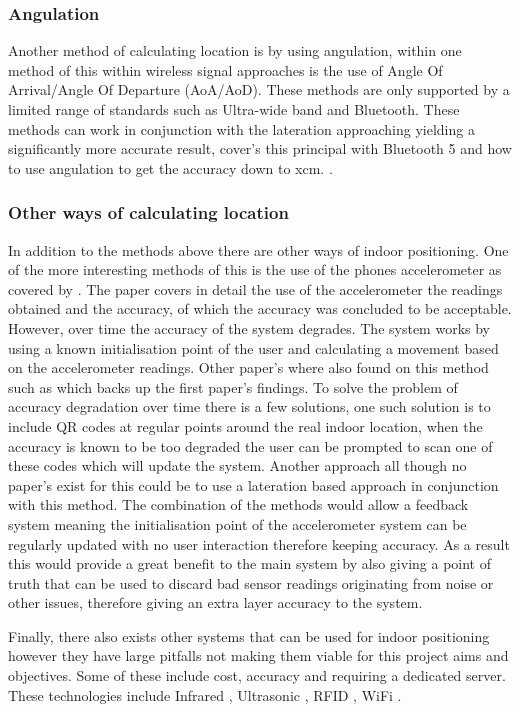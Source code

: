 \subsubsection{Angulation}
Another method of calculating location is by using angulation, within one method of this within wireless signal approaches is the use of Angle Of Arrival/Angle Of Departure (AoA/AoD). These methods are only supported by a limited range of standards such as Ultra-wide band and Bluetooth. These methods can work in conjunction with the lateration approaching yielding a significantly more accurate result, \citetemp cover's this principal with Bluetooth 5 and how to use angulation to get the accuracy down to xcm. .

\subsubsection{Other ways of calculating location}
In addition to the methods above there are other ways of indoor positioning. One of the more interesting methods of this is the use of the phones accelerometer as covered by \citetemp. The paper covers in detail the use of the accelerometer the readings obtained and the accuracy, of which the accuracy was concluded to be acceptable. However, over time the accuracy of the system degrades. The system works by using a known initialisation point of the user and calculating a movement based on the accelerometer readings. Other paper's where also found on this method such as \citetemp which backs up the first paper's findings. To solve the problem of accuracy degradation over time there is a few solutions, one such solution is to include QR codes at regular points around the real indoor location, when the accuracy is known to be too degraded the user can be prompted to scan one of these codes which will update the system. Another approach all though no paper's exist for this could be to use a lateration based approach in conjunction with this method. The combination of the methods would allow a feedback system meaning the initialisation point of the accelerometer system can be regularly updated with no user interaction therefore keeping accuracy. As a result this would provide a great benefit to the main system by also giving a point of truth that can be used to discard bad sensor readings originating from noise or other issues, therefore giving an extra layer accuracy to the system.

Finally, there also exists other systems that can be used for indoor positioning however they have large pitfalls not making them viable for this project aims and objectives. Some of these include cost, accuracy and requiring a dedicated server. These technologies include Infrared \citetemp, Ultrasonic \citetemp, RFID \citetemp, WiFi \citetemp. 
